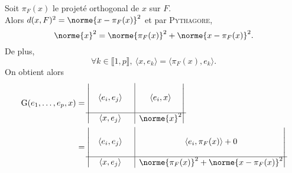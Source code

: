 \begin{preuve}
    Soit $\pi_F(x)$ le projeté orthogonal de $x$ sur $F$. \\
    Alors $d(x, F)^2 = \norme{x - \pi_F(x)}^2$ et par \textsc{Pythagore},
    $$\norme{x}^2 = \norme{\pi_F(x)}^2 + \norme{x - \pi_F(x)}^2.$$
    De plus, 
    $$\forall k \in \llbracket 1, p \rrbracket,\ \langle x , e_k \rangle = \langle \pi_F(x) , e_k \rangle.$$
    On obtient alors
    \begin{align*}
        \Gram(e_1, \dots, e_p, x) &= 
        \begin{vmatrix}
          \begin{matrix}
            & & \\
            & \langle e_i, e_j \rangle & \\
            & &
          \end{matrix}
          & \rvline & \langle e_i, x \rangle \\
        \hline
          \langle x, e_j \rangle & \rvline &
          \begin{matrix}
          \norme{x}^2
          \end{matrix}
        \end{vmatrix} \\
        &=
        \begin{vmatrix}
          \begin{matrix}
            & & \\
            & \langle e_i, e_j \rangle & \\
            & &
          \end{matrix}
          & \rvline & \langle e_i, \pi_F(x) \rangle + 0 \\
        \hline
          \langle x, e_j \rangle & \rvline &
          \begin{matrix}
          \norme{\pi_F(x)}^2 + \norme{x - \pi_F(x)}^2
          \end{matrix}
        \end{vmatrix} 
    \end{align*}
\end{preuve}
